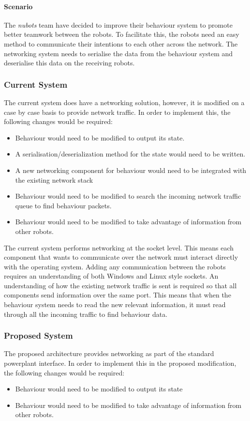 \documentclass[english,12pt]{scrartcl}
\begin{document}
			\paragraph{Scenario} The \emph{\gls{nubots}} team have decided to improve their behaviour system to promote better teamwork between the robots.
			To facilitate this, the robots need an easy method to communicate their intentions to each other across the network.
			The networking system needs to serialise the data from the behaviour system and deserialise this data on the receiving robots.
			
			\subsubsection{Current System}
				The current system does have a networking solution, however, it is modified on a case by case basis to provide network traffic.
				In order to implement this, the following changes would be required:
				\begin{itemize}
					\item Behaviour would need to be modified to output its state.
					\item A serialisation/deserialization method for the state would need to be written.
					\item A new networking component for behaviour would need to be integrated with the existing network stack
					\item Behaviour would need to be modified to search the incoming network traffic queue to find behaviour packets.
					\item Behaviour would need to be modified to take advantage of information from other robots.
				\end{itemize}
				
				The current system performs networking at the socket level.
				This means each component that wants to communicate over the network must interact directly with the operating system.
				Adding any communication between the robots requires an understanding of both Windows and Linux style sockets.
				An understanding of how the existing network traffic is sent is required so that all components send information over the same port.
				This means that when the behaviour system needs to read the new relevant information, it must read through all the incoming traffic to find behaviour data.
				
			\subsubsection{Proposed System}
				The proposed architecture provides networking as part of the standard \gls{powerplant} interface.
				In order to implement this in the proposed modification, the following changes would be required:
				\begin{itemize}
					\item Behaviour would need to be modified to output its state
					\item Behaviour would need to be modified to take advantage of information from other robots.
				\end{itemize}
				
\end{document}
